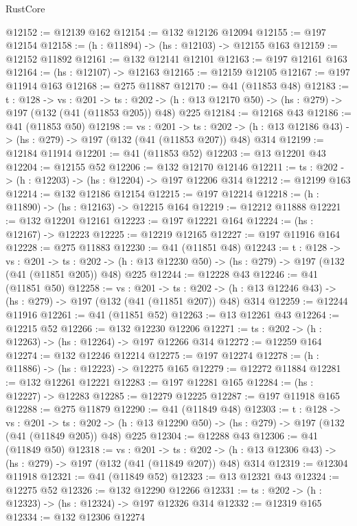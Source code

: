 \begin{lexlean}{RustCore}
\begin{coremodule}
@12152 := @12139 @162
@12154 := @132 @12126 @12094
@12155 := @197 @12154
@12158 := (h : @11894) -> (hs : @12103) -> @12155 @163
@12159 := @12152 @11892
@12161 := @132 @12141 @12101
@12163 := @197 @12161 @163
@12164 := (hs : @12107) -> @12163
@12165 := @12159 @12105
@12167 := @197 @11914 @163
@12168 := @275 @11887
@12170 := @41 (@11853 @48)
@12183 := {t : @128} ->
  {vs : @201} ->
  {ts : @202} -> (h : @13 @12170 @50) -> (hs : @279) -> @197 (@132 (@41 (@11853 @205)) @48) @225
@12184 := @12168 @43
@12186 := @41 (@11853 @50)
@12198 := {vs : @201} ->
  {ts : @202} -> (h : @13 @12186 @43) -> (hs : @279) -> @197 (@132 (@41 (@11853 @207)) @48) @314
@12199 := @12184 @11914
@12201 := @41 (@11853 @52)
@12203 := @13 @12201 @43
@12204 := @12155 @52
@12206 := @132 @12170 @12146
@12211 := {ts : @202} -> (h : @12203) -> (hs : @12204) -> @197 @12206 @314
@12212 := @12199 @163
@12214 := @132 @12186 @12154
@12215 := @197 @12214
@12218 := (h : @11890) -> (hs : @12163) -> @12215 @164
@12219 := @12212 @11888
@12221 := @132 @12201 @12161
@12223 := @197 @12221 @164
@12224 := (hs : @12167) -> @12223
@12225 := @12219 @12165
@12227 := @197 @11916 @164
@12228 := @275 @11883
@12230 := @41 (@11851 @48)
@12243 := {t : @128} ->
  {vs : @201} ->
  {ts : @202} -> (h : @13 @12230 @50) -> (hs : @279) -> @197 (@132 (@41 (@11851 @205)) @48) @225
@12244 := @12228 @43
@12246 := @41 (@11851 @50)
@12258 := {vs : @201} ->
  {ts : @202} -> (h : @13 @12246 @43) -> (hs : @279) -> @197 (@132 (@41 (@11851 @207)) @48) @314
@12259 := @12244 @11916
@12261 := @41 (@11851 @52)
@12263 := @13 @12261 @43
@12264 := @12215 @52
@12266 := @132 @12230 @12206
@12271 := {ts : @202} -> (h : @12263) -> (hs : @12264) -> @197 @12266 @314
@12272 := @12259 @164
@12274 := @132 @12246 @12214
@12275 := @197 @12274
@12278 := (h : @11886) -> (hs : @12223) -> @12275 @165
@12279 := @12272 @11884
@12281 := @132 @12261 @12221
@12283 := @197 @12281 @165
@12284 := (hs : @12227) -> @12283
@12285 := @12279 @12225
@12287 := @197 @11918 @165
@12288 := @275 @11879
@12290 := @41 (@11849 @48)
@12303 := {t : @128} ->
  {vs : @201} ->
  {ts : @202} -> (h : @13 @12290 @50) -> (hs : @279) -> @197 (@132 (@41 (@11849 @205)) @48) @225
@12304 := @12288 @43
@12306 := @41 (@11849 @50)
@12318 := {vs : @201} ->
  {ts : @202} -> (h : @13 @12306 @43) -> (hs : @279) -> @197 (@132 (@41 (@11849 @207)) @48) @314
@12319 := @12304 @11918
@12321 := @41 (@11849 @52)
@12323 := @13 @12321 @43
@12324 := @12275 @52
@12326 := @132 @12290 @12266
@12331 := {ts : @202} -> (h : @12323) -> (hs : @12324) -> @197 @12326 @314
@12332 := @12319 @165
@12334 := @132 @12306 @12274

\end{coremodule}
\end{lexlean}
